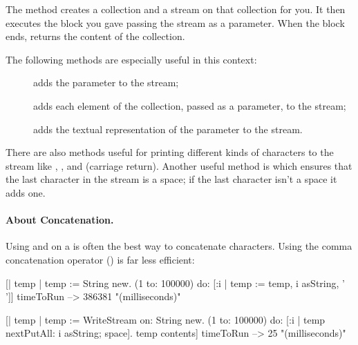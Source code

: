 \documentclass[a4paper,10pt,twoside]{book}
\begin{document}

The method  \label{sec:streamContents} creates a collection and a stream on
that collection for you.
It then executes the block you gave passing the stream as a parameter.
When the block ends,  returns the content of the collection.

The following  methods are especially useful in this context:

\begin{description}
\item[] adds the parameter to the stream;
\item[] adds each element of the collection, passed as a
  parameter, to the stream;
\item[] adds the textual representation of the parameter to the
  stream.
\end{description}

There are also methods useful for printing different kinds of characters to the stream like , , and  (carriage return).
Another useful method is  which ensures that the last character in the stream is a space; if the last character isn't a space it adds one.

\paragraph{About Concatenation.}
Using  and  on a  is often the best way to concatenate characters.
Using the comma concatenation operator (\ct{,}) is far less efficient:

\begin{code}{}
[| temp |
  temp := String new.
  (1 to: 100000) do: [:i | 
    temp := temp, i asString, ' ']] timeToRun --> 386381 "(milliseconds)"

[| temp |
  temp := WriteStream on: String new.
  (1 to: 100000) do: [:i | 
    temp nextPutAll: i asString; space].
  temp contents] timeToRun --> 25 "(milliseconds)"
\end{code}
\end{document}
